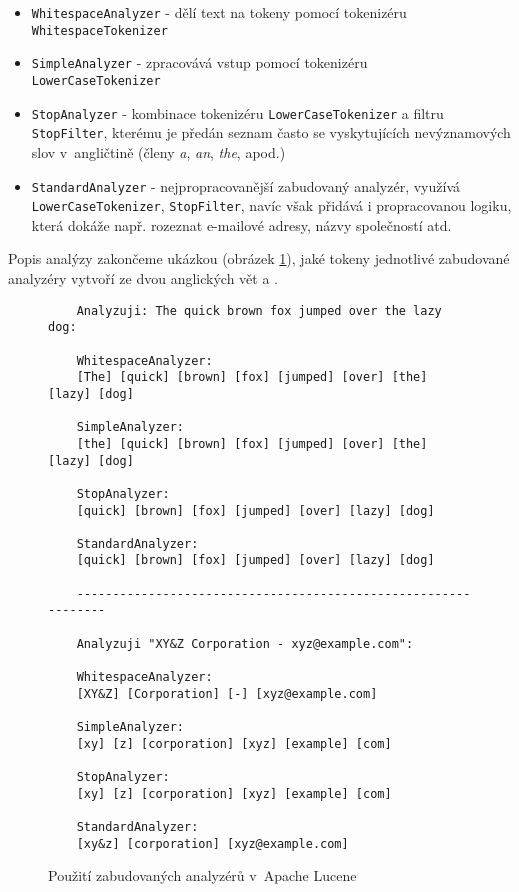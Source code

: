 \documentclass[11pt,oneside]{fithesis2}
\begin{document}
\begin{itemize}
	\item \texttt{WhitespaceAnalyzer} - dělí text na tokeny pomocí tokenizéru \\ \texttt{WhitespaceTokenizer}
	\item \texttt{SimpleAnalyzer} - zpracovává vstup pomocí tokenizéru \\ \texttt{LowerCaseTokenizer}
	\item \texttt{StopAnalyzer} - kombinace tokenizéru \texttt{LowerCaseTokenizer} a filtru \texttt{StopFilter}, kterému je předán seznam často se vyskytujících nevýznamových slov v~angličtině (členy \emph{a}, \emph{an}, \emph{the}, apod.)
	\item \texttt{StandardAnalyzer} - nejpropracovanější zabudovaný analyzér, využívá \texttt{LowerCaseTokenizer}, \texttt{StopFilter}, navíc však přidává i propracovanou logiku, která dokáže např. rozeznat e-mailové adresy, názvy společností atd.
\end{itemize}

Popis analýzy zakončeme ukázkou (obrázek \ref{AnalysisExample}), jaké tokeny jednotlivé zabudované analyzéry vytvoří ze dvou anglických vět \emph{} a \emph{}.

\begin{figure}[!htbp]
	\begin{verbatim}
	Analyzuji: The quick brown fox jumped over the lazy dog:

	WhitespaceAnalyzer:
	[The] [quick] [brown] [fox] [jumped] [over] [the] [lazy] [dog]

	SimpleAnalyzer:
	[the] [quick] [brown] [fox] [jumped] [over] [the] [lazy] [dog]

	StopAnalyzer:
	[quick] [brown] [fox] [jumped] [over] [lazy] [dog]

	StandardAnalyzer:
	[quick] [brown] [fox] [jumped] [over] [lazy] [dog]

	---------------------------------------------------------------

	Analyzuji "XY&Z Corporation - xyz@example.com":

	WhitespaceAnalyzer:
	[XY&Z] [Corporation] [-] [xyz@example.com]

	SimpleAnalyzer:
	[xy] [z] [corporation] [xyz] [example] [com]

	StopAnalyzer:
	[xy] [z] [corporation] [xyz] [example] [com]

	StandardAnalyzer:
	[xy&z] [corporation] [xyz@example.com]
	\end{verbatim}
	\caption{Použití zabudovaných analyzérů v~Apache Lucene}
	\label{AnalysisExample}
\end{figure}
\end{document}
